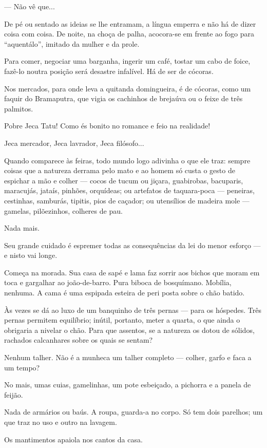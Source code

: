 --- Não vê que...

De pé ou sentado as ideias se lhe entramam, a língua emperra e não há de
dizer coisa com coisa. De noite, na choça de palha, acocora-se em frente
ao fogo para ``aquentálo'', imitado da mulher e da prole.

Para comer, negociar uma barganha, ingerir um café, tostar um cabo de
foice, fazê-lo noutra posição será desastre infalível. Há de ser de
cócoras.

Nos mercados, para onde leva a quitanda domingueira, é de cócoras, como
um faquir do Bramaputra, que vigia os cachinhos de brejaúva ou o feixe
de três palmitos.

Pobre Jeca Tatu! Como és bonito no romance e feio na realidade!

Jeca mercador, Jeca lavrador, Jeca filósofo...

Quando comparece às feiras, todo mundo logo adivinha o que ele traz:
sempre coisas que a natureza derrama pelo mato e ao homem só custa o
gesto de espichar a mão e colher --- cocos de tucum ou jiçara,
guabirobas, bacuparis, maracujás, jataís, pinhões, orquídeas; ou
artefatos de taquara-poca --- peneiras, cestinhas, samburás, tipitis,
pios de caçador; ou utensílios de madeira mole --- gamelas, pilõezinhos,
colheres de pau.

Nada mais.

Seu grande cuidado é espremer todas as consequências da lei do menor
esforço --- e nisto vai longe.

Começa na morada. Sua casa de sapé e lama faz sorrir aos bichos que
moram em toca e gargalhar ao joão-de-barro. Pura biboca de bosquímano.
Mobília, nenhuma. A cama é uma espipada esteira de peri posta sobre o
chão batido.

Às vezes se dá ao luxo de um banquinho de três pernas --- para os
hóspedes. Três pernas permitem equilíbrio; inútil, portanto, meter a
quarta, o que ainda o obrigaria a nivelar o chão. Para que assentos, se
a natureza os dotou de sólidos, rachados calcanhares sobre os quais se
sentam?

Nenhum talher. Não é a munheca um talher completo --- colher, garfo e
faca a um tempo?

No mais, umas cuias, gamelinhas, um pote esbeiçado, a pichorra e a
panela de feijão.

Nada de armários ou baús. A roupa, guarda-a no corpo. Só tem dois
parelhos; um que traz no uso e outro na lavagem.

Os mantimentos apaiola nos cantos da casa.

